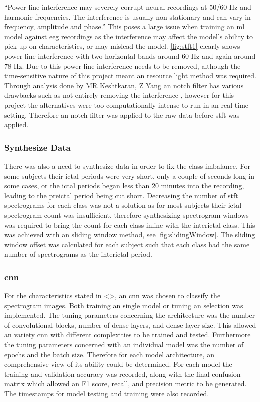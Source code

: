 \documentclass[12pt]{article}
\begin{document}
``Power line interference may severely corrupt neural recordings at 50/60 Hz and harmonic frequencies. The interference is usually non-stationary and can vary in frequency, amplitude and phase.'' \cite{keshtkaran2014fast} This poses a large issue when training an \acrshort{ml} model against \acrshort{eeg} recordings as the interference may affect the model's ability to pick up on characteristics, or may mislead the model. \ref{fig:stft1} clearly shows power line interference with two horizontal bands around 60 Hz and again around 78 Hz. Due to this power line interference needs to be removed, although the time-sensitive nature of this project meant an resource light method was required. Through analysis done by MR Keshtkaran, Z Yang an notch filter has various drawbacks such as not entirely removing the interference \cite{keshtkaran2014fast}, however for this project the alternatives were too computationally intense to run in an real-time setting. Therefore an notch filter was applied to the raw data before \acrshort{stft} was applied. 


\subsubsection{Synthesize Data}

There was also a need to synthesize data in order to fix the class imbalance. For some subjects their ictal periods were very short, only a couple of seconds long in some cases, or the ictal periods began less than 20 minutes into the recording, leading to the preictal period being cut short. Decreasing the number of \acrshort{stft} spectrograms for each class was not a solution as for most subjects their ictal spectrogram count was insufficient, therefore synthesizing spectrogram windows was required to bring the count for each class inline with the interictal class. This was achieved with an sliding window method, see \ref{fig:slidingWindow}. The sliding window offset was calculated for each subject such that each class had the same number of spectrograms as the interictal period.

\subsubsection{\acrfull{cnn}}

For the characteristics stated in <>, an \acrshort{cnn} was chosen to classify the spectrogram images. Both training an single model or tuning an selection was implemented. The tuning parameters concerning the architecture was the number of convolutional blocks, number of dense layers, and dense layer size. This allowed an variety \acrshort{cnn} with different complexities to be trained and tested.  Furthermore the tuning parameters concerned with an individual model was the number of epochs and the batch size. Therefore for each model architecture, an comprehensive view of its ability could be determined. For each model the training and validation accuracy was recorded, along with the final confusion matrix which allowed an F1 score, recall, and precision metric to be generated. The timestamps for model testing and training were also recorded. 
\end{document}
